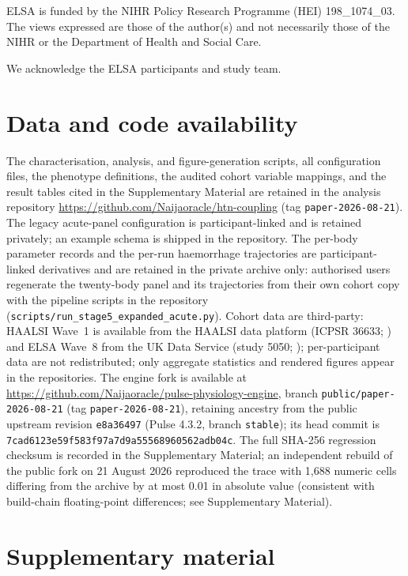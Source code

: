 \documentclass[preprint,12pt,nopreprintline]{elsarticle}
\begin{document}
ELSA is funded by the NIHR Policy Research Programme (HEI) 198\_1074\_03. The views expressed are those of the author(s) and not necessarily those of the NIHR or the Department of Health and Social Care.

We acknowledge the ELSA participants and study team.\\

\section{Data and code availability}

The characterisation, analysis, and figure-generation scripts, all configuration files, the phenotype definitions, the audited cohort variable mappings, and the result tables cited in the Supplementary Material are retained in the analysis repository \url{https://github.com/Naijaoracle/htn-coupling} (tag \texttt{paper-2026-08-21}). The legacy acute-panel configuration is participant-linked and is retained privately; an example schema is shipped in the repository. The per-body parameter records and the per-run haemorrhage trajectories are participant-linked derivatives and are retained in the private archive only: authorised users regenerate the twenty-body panel and its trajectories from their own cohort copy with the pipeline scripts in the repository (\texttt{scripts/run\_stage5\_expanded\_acute.py}). Cohort data are third-party: HAALSI Wave~1 is available from the HAALSI data platform (ICPSR 36633; \cite{haalsidata}) and ELSA Wave~8 from the UK Data Service (study 5050; \cite{elsadata}); per-participant data are not redistributed; only aggregate statistics and rendered figures appear in the repositories. The engine fork is available at \url{https://github.com/Naijaoracle/pulse-physiology-engine}, branch \texttt{public/paper-2026-08-21} (tag \texttt{paper-2026-08-21}), retaining ancestry from the public upstream revision \texttt{e8a36497} (Pulse 4.3.2, branch \texttt{stable}); its head commit is \texttt{7cad6123e59f583f97a7d9a55568960562adb04c}. The full SHA-256 regression checksum is recorded in the Supplementary Material; an independent rebuild of the public fork on 21 August 2026 reproduced the trace with 1{,}688 numeric cells differing from the archive by at most 0.01 in absolute value (consistent with build-chain floating-point differences; see Supplementary Material).

\appendix

\section{Supplementary material}
\end{document}
